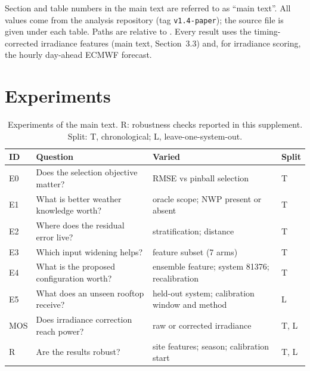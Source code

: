 \DeclareRobustCommand{\srcpath}[1]{\path{#1}}
\setcounter{section}{0}
\setcounter{table}{0}
\renewcommand{\thesection}{S\arabic{section}}
\renewcommand{\thetable}{S\arabic{table}}
\renewcommand{\theHsection}{S\arabic{section}}
\renewcommand{\theHtable}{S\arabic{table}}

Section and table numbers in the main text are referred to as ``main text''. All values come from the analysis repository (tag \texttt{v1.4-paper}); the source file is given under each table. Paths are relative to \srcpath{v3_ensemble/}. Every result uses the timing-corrected irradiance features (main text, Section~3.3) and, for irradiance scoring, the hourly day-ahead ECMWF forecast.

\section{Experiments}
\label{sec:s-experiments}

\begin{table}[H]
\centering
\caption{Experiments of the main text. R: robustness checks reported in this supplement. Split: T, chronological; L, leave-one-system-out.}
\label{tab:experiments}
\small
\begin{tabularx}{\textwidth}{@{}l >{\raggedright\arraybackslash}X >{\raggedright\arraybackslash}X l@{}}
\toprule
ID & Question & Varied & Split \\
\midrule
E0 & Does the selection objective matter? & RMSE vs pinball selection & T \\
E1 & What is better weather knowledge worth? & oracle scope; NWP present or absent & T \\
E2 & Where does the residual error live? & stratification; distance & T \\
E3 & Which input widening helps? & feature subset (7 arms) & T \\
E4 & What is the proposed configuration worth? & ensemble feature; system 81376; recalibration & T \\
E5 & What does an unseen rooftop receive? & held-out system; calibration window and method & L \\
MOS & Does irradiance correction reach power? & raw or corrected irradiance & T, L \\
R & Are the results robust? & site features; season; calibration start & T, L \\
\bottomrule
\end{tabularx}
\end{table}

